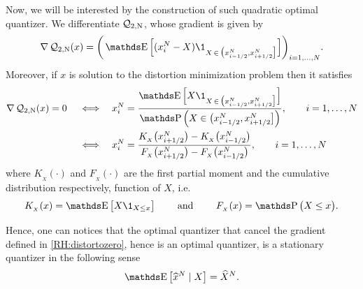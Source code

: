 Now, we will be interested by the construction of such quadratic optimal quantizer. We differentiate $\operatorname{\mathcal{Q}_{2,N}}$, whose gradient is given by
\begin{equation}
	\nabla \Distortion ( x )
	= \bigg( \E \Big[ ( x_i^N - X ) \1_{ X \, \in \, \big( x_{i - 1/2}^N, x_{i + 1/2}^N \big] } \Big] \bigg)_{i = 1, \dots, N}.
\end{equation}
Moreover, if $x$ is solution to the distortion minimization problem then it satisfies
\begin{equation}\label{RH:distortozero}
	\begin{aligned}
		\nabla \Distortion ( x ) = 0
		\quad \iff \quad & x_i^N = \frac{ \E \Big[ X \1_{ X \, \in \, \big( x_{i - 1/2}^N, x_{i + 1/2}^N \big] } \Big] }{ \Prob \Big( X \in \big( x_{i - 1/2}^N, x_{i + 1/2}^N \big] \Big) }, \qquad i = 1, \dots, N \\
		\quad \iff \quad & x_i^N = \frac{ K_{_X} \big( x_{i + 1/2}^N \big) - K_{_X} \big( x_{i - 1/2}^N \big) }{ F_{_X} \big( x_{i + 1/2}^N \big) - F_{_X} \big( x_{i - 1/2}^N \big) }, \qquad i = 1, \dots, N       \\
	\end{aligned}
\end{equation}
where $K_{_X}(\cdot)$ and $F_{_X}(\cdot)$ are the first partial moment and the cumulative distribution respectively, function of $X$, i.e.
\begin{equation}
	K_{_X}( x ) = \E \big[ X \1_{X \leq x} \big] \qquad \textrm{ and } \qquad F_{_X}( x ) = \Prob \big( X \leq x \big).
\end{equation}

Hence, one can notices that the optimal quantizer that cancel the gradient defined in \eqref{RH:distortozero}, hence is an optimal quantizer, is a stationary quantizer in the following sense
\begin{equation}
	\E \big[ \widehat x^N \mid X \big] = \widehat X^N.
\end{equation}

